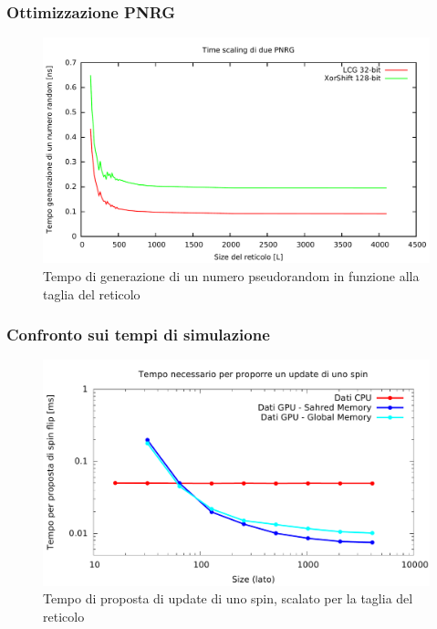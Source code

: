 \documentclass{beamer}
\begin{document}
	\begin{frame}
			\frametitle{Ottimizzazione PNRG}
			\begin{figure}
					\includegraphics[scale=0.32]{../../CUDA/Result/Res3/Time_PNRG.pdf}
					\caption{Tempo di generazione di un numero pseudorandom in funzione alla taglia del reticolo}
			\end{figure}
	\end{frame}

	\begin{frame}
			\frametitle{Confronto sui tempi di simulazione}
			\begin{figure}
					\includegraphics[scale=0.32]{../../CPU-GPU-time.pdf}
					\caption{Tempo di proposta di update di uno spin, scalato per la taglia del reticolo}
			\end{figure}
	\end{frame}
\end{document}
